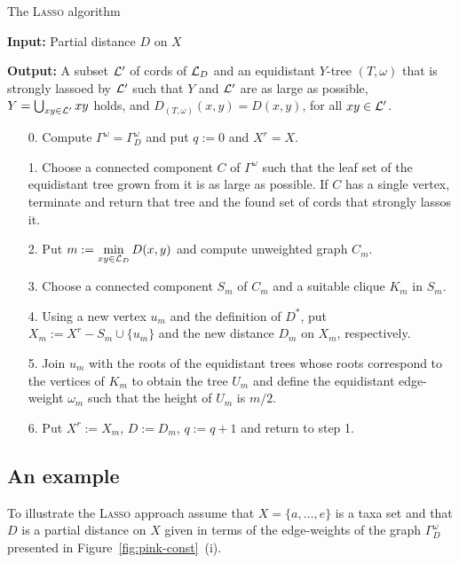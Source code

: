 \begin{algorithm}
  \caption{The \textsc{Lasso} algorithm}
  \label{alg:lasso}
  \textbf{Input:} Partial distance $D$ on $X$ 

  \textbf{Output:} A subset ${\mathcal L}'$ of cords of ${\mathcal L}_D$ and an equidistant
  $Y$-tree $(T,\omega)$ that is strongly lassoed by ${\mathcal L}'$ such that $Y$ and
  ${\mathcal L}'$ are as large as possible, $Y=\bigcup_{xy\in {\mathcal L}'}xy$ holds, and
  $D_{(T,\omega)}(x,y) = D(x,y)$, for all $xy \in {\mathcal L}'$.

  \begin{itemize}
  \item[0.] Compute $\Gamma^{\omega} =\Gamma^{\omega}_D$ and put $q := 0$
and $X^r=X$.
  \item[1.] Choose a connected component $C$ of  $\Gamma^{\omega}$ 
such that the leaf set of the equidistant tree grown from it is as 
large as possible.  If $C$ has a single vertex, terminate 
and return that tree and the found set of cords that strongly lassos it.
  \item[2.] Put $\displaystyle m := \min_{xy \in {\mathcal L}_D} D(x,y)$
and compute unweighted graph $C_m$. 
  \item[3.] Choose a connected component $S_m$ of $C_m$ and a suitable
clique $K_m$ in $S_m$.
\item[4.] Using a new vertex $u_m$ and the definition of $D^*$, put $X_m :=
  X^r - S_m \cup \{u_m\}$ and the new distance $D_m$ on $X_m$, respectively.
  \item[5.] Join $u_m$ with the roots of the equidistant trees 
whose roots correspond to the vertices of $K_m$ to obtain the tree $U_m$
and define the equidistant edge-weight $\omega_m$ such that the height of
$U_m$ is $m/2$.
  \item[6.] Put $X^r:=X_m$, $D:=D_m$, $q := q+1$ and return to step 1.
  \end{itemize}
\end{algorithm}

\subsection{An example}
\label{sec:example}

To illustrate the \textsc{Lasso} approach assume that $X=\{a,\ldots, e\}$ is a
taxa set and that $D$ is a partial distance on $X$ given in terms of the
edge-weights of the graph $\Gamma^{\omega}_D$ presented in
Figure~\ref{fig:pink-const}~(i).

